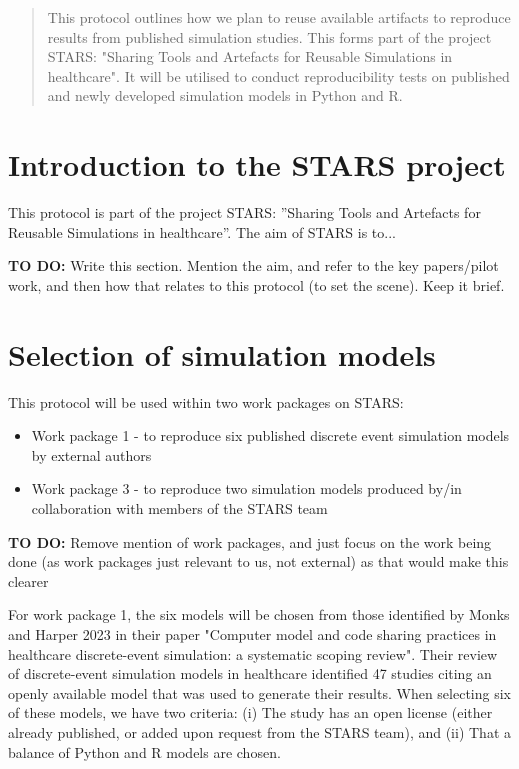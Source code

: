 \begin{shaded}
    \begin{abstract}
        This protocol outlines how we plan to reuse available artifacts to reproduce results from published simulation studies. This forms part of the project STARS: "Sharing Tools and Artefacts for Reusable Simulations in healthcare". It will be utilised to conduct reproducibility tests on published and newly developed simulation models in Python and R.
    \end{abstract}
\end{shaded}

\vspace{0.5cm}

\section{Introduction to the STARS project}

This protocol is part of the project STARS: ”Sharing Tools and Artefacts for Reusable Simulations in healthcare”. The aim of STARS is to...

\textbf{TO DO:} Write this section. Mention the aim, and refer to the key papers/pilot work, and then how that relates to this protocol (to set the scene). Keep it brief.

\autocite{monks_towards_2024}

\section{Selection of simulation models}

This protocol will be used within two work packages on STARS:
\begin{itemize}
    \item Work package 1 - to reproduce six published discrete event simulation models by external authors
    \item Work package 3 - to reproduce two simulation models produced by/in collaboration with members of the STARS team
\end{itemize}

\textbf{TO DO:} Remove mention of work packages, and just focus on the work being done (as work packages just relevant to us, not external) as that would make this clearer

For work package 1, the six models will be chosen from those identified by Monks and Harper 2023\autocite{monks_computer_2023} in their paper "Computer model and code sharing practices in healthcare discrete-event simulation: a systematic scoping review". Their review of discrete-event simulation models in healthcare identified 47 studies citing an openly available model that was used to generate their results. When selecting six of these models, we have two criteria: (i) The study has an open license (either already published, or added upon request from the STARS team), and (ii) That a balance of Python and R models are chosen.

